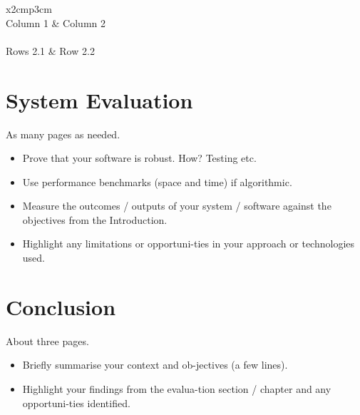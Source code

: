\begin{table}[h]
	\centering
	\begin{tabular}{x{2cm}p{3cm}}
		\toprule \\
		Column 1 & Column 2 \\
		\midrule \\
		Rows 2.1 & Row 2.2 \\
		\bottomrule
	\end{tabular}
	\caption{A table.}
	\label{table:mytable}
\end{table}

\chapter{System Evaluation}
As many pages as needed.
\begin{itemize}
	\item Prove that your software is robust. How? Testing etc. 
	\item Use performance benchmarks (space and time) if algorithmic.
	\item Measure the outcomes / outputs of your system / software against the objectives from the Introduction.
	\item Highlight any limitations or opportuni-ties in your approach or technologies used.
\end{itemize}

\chapter{Conclusion}
About three pages.

\begin{itemize}
	\item Briefly summarise your context and ob-jectives (a few lines).
	\item Highlight your findings from the evalua-tion section / chapter and any opportuni-ties identified.
\end{itemize}

